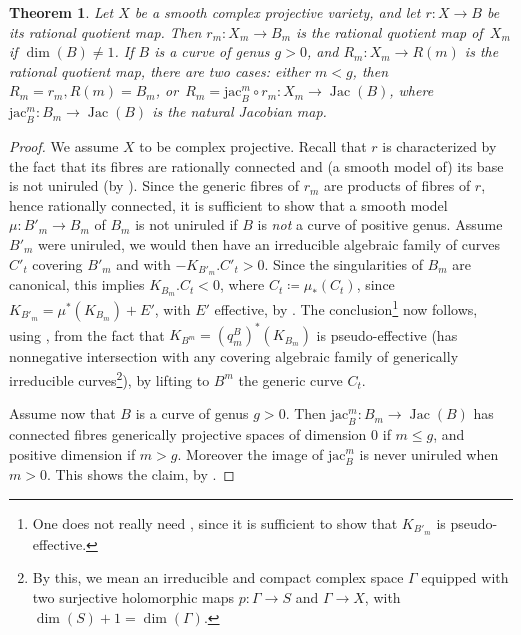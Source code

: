 \documentclass[JEP,XML,SOM,Unicode, NoEqCountersInSection,NoFloatCountersInSection,published]{cedram}
\newcommand{\jac}{\mathrm{jac}}
\DeclareMathOperator{\Jac}{Jac}
\theoremstyle{theorem}
\newtheorem{theorem}{Theorem}
\theoremstyle{definition}
\begin{document}

\begin{theorem}\label{rq}
Let \(X\) be a smooth complex projective variety, and let $r:X\to B$ be its rational quotient map. Then $r_m:X_m\to B_m$ is the rational quotient map of~$X_m$ if $\dim(B)\neq 1$.
If $B$ is a curve of genus $g>0$, and $R_m:X_m\to R(m)$ is the rational quotient map, there are two cases: either $m<g$, then $R_m=r_m, R(m)=B_m$, or~$R_m=\jac^m_B\circ r_m:X_m\to \Jac(B)$, where $\jac^m_B:B_m\to \Jac(B)$ is the natural Jacobian map.
\end{theorem}

\begin{proof} We assume $X$ to be complex projective. Recall that $r$ is characterized by the fact that its fibres are rationally connected and (a smooth model of) its base is not uniruled (by \cite{GHS}). Since the generic fibres of $r_m$ are products of fibres of $r$, hence rationally connected, it is sufficient to show that a smooth model $\mu:B'_m\to B_m$ of $B_m$ is not uniruled if $B$ is \emph{not} a curve of positive genus. Assume $B'_m$ were uniruled, we would then have an irreducible algebraic family of curves $C'_t$ covering $B'_m$ and with $-K_{B'_m}.C'_t>0$. Since the singularities of $B_m$ are canonical, this implies $K_{B_m}.C_t<0$, where $C_t\coloneqq \mu_*(C_t)$, since $K_{B'_m}=\mu^*(K_{B_m})+E'$, with $E'$ effective, by \cite{AA02}. The conclusion\footnote{One does not really need \cite{Miyaoka-Mori}, since it is sufficient to show that $K_{B'_m}$ is pseudo-effective.} now follows, using \cite{Miyaoka-Mori}, from the fact that $K_{B^m}=(q_m^B)^*(K_{B_m})$ is pseudo-effective (\ie has nonnegative intersection with any covering algebraic family of generically irreducible curves\footnote{By this, we mean an irreducible and compact complex space $\Gamma$ equipped with two surjective holomorphic maps $p:\Gamma \to S$ and $\Gamma\to X$, with $\dim(S)+1=\dim(\Gamma)$.}), by lifting to $B^m$ the generic curve $C_t$.

Assume now that $B$ is a curve of genus $g>0$. Then $\jac^m_B:B_m\to \Jac(B)$ has connected fibres generically projective spaces of dimension $0$ if $m\leq g$, and positive dimension if $m>g$. Moreover the image of $\jac^m_B$ is never uniruled when $m>0$. This shows the claim, by \cite{GHS}.
\end{proof}
\end{document}
